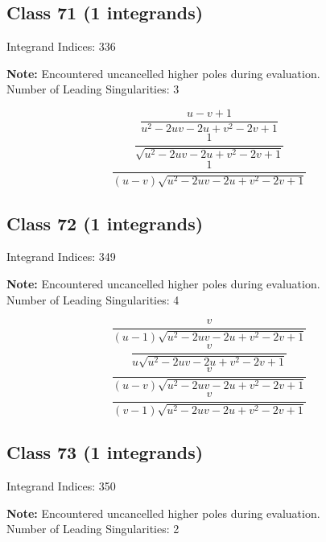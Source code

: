 \documentclass[11pt,a4paper]{article}
\begin{document}
\subsection*{Class 71 (1 integrands)}
Integrand Indices: 336

\textbf{Note:} Encountered uncancelled higher poles during evaluation.\\[1em]

Number of Leading Singularities: 3

\begin{equation}
\frac{u-v+1}{u^2-2 u v-2 u+v^2-2 v+1}
\end{equation}
\begin{equation}
\frac{1}{\sqrt{u^2-2 u v-2 u+v^2-2 v+1}}
\end{equation}
\begin{equation}
\frac{1}{(u-v) \sqrt{u^2-2 u v-2 u+v^2-2 v+1}}
\end{equation}


\subsection*{Class 72 (1 integrands)}
Integrand Indices: 349

\textbf{Note:} Encountered uncancelled higher poles during evaluation.\\[1em]

Number of Leading Singularities: 4

\begin{equation}
\frac{v}{(u-1) \sqrt{u^2-2 u v-2 u+v^2-2 v+1}}
\end{equation}
\begin{equation}
\frac{v}{u \sqrt{u^2-2 u v-2 u+v^2-2 v+1}}
\end{equation}
\begin{equation}
\frac{v}{(u-v) \sqrt{u^2-2 u v-2 u+v^2-2 v+1}}
\end{equation}
\begin{equation}
\frac{v}{(v-1) \sqrt{u^2-2 u v-2 u+v^2-2 v+1}}
\end{equation}


\subsection*{Class 73 (1 integrands)}
Integrand Indices: 350

\textbf{Note:} Encountered uncancelled higher poles during evaluation.\\[1em]

Number of Leading Singularities: 2
\end{document}
